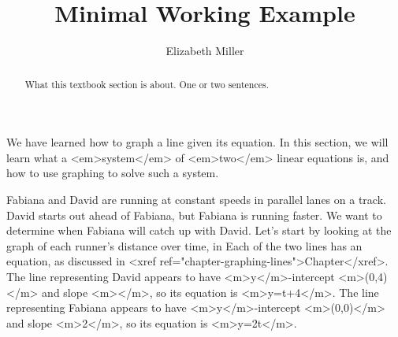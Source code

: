 \documentclass[nooutcomes]{ximera}
\author{Elizabeth Miller}
\title{Minimal Working Example}
\begin{document}
\begin{abstract}
  What this textbook section is about.  One or two sentences.
\end{abstract}
\maketitle

     We have learned how to graph a line given its equation.
      In this section, we will learn what a <em>system</em>
      of <em>two</em> linear equations is,
      and how to use graphing to solve such a system.
\begin{example}
Fabiana and David are running at constant speeds in parallel lanes on a track.
            David starts out ahead of Fabiana,
            but Fabiana is running faster.
            We want to determine when Fabiana will catch up with David.
            Let's start by looking at the graph of each runner's distance over time,
            in 
   Each of the two lines has an equation,
            as discussed in <xref ref="chapter-graphing-lines">Chapter</xref>.
            The line representing David appears to have <m>y</m>-intercept <m>(0,4)</m> and slope <m></m>,
            so its equation is <m>y=t+4</m>.
            The line representing Fabiana appears to have <m>y</m>-intercept <m>(0,0)</m> and slope <m>2</m>,
            so its equation is <m>y=2t</m>.

\end{example}
\end{document}
